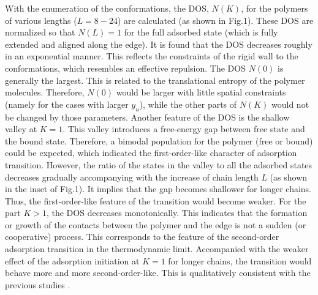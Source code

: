 \documentclass[aps,pre,twocolumn,showpacs,preprintnumbers,amsmath,amssymb]{revtex4-1}
\begin{document}
With the enumeration of the conformations, the DOS, $N(K)$, for the polymers
of various lengths ($L=8-24$)
are calculated (as shown in Fig.1). These DOS are normalized so that $N(L)=1$
for the full adsorbed state (which is fully extended and aligned along the edge).
It is found that the DOS decreases roughly in an exponential manner. This
reflects the constraints of the rigid wall to the conformations, which
resembles an effective repulsion. The DOS $N(0)$ is generally the largest.
This is related to the translational entropy of the polymer molecules.
Therefore, $N(0)$ would be larger with little spatial constraints
(namely for the cases with larger $y_u$), while the other parts of $N(K)$
would not be changed by those parameters. Another feature of the DOS
is the shallow valley at $K=1$. This valley introduces a free-energy
gap between free state and the bound state. Therefore, a bimodal
population for the polymer (free or bound) could be expected, which
indicated the first-order-like character of adsorption transition.
However, the ratio of the states in the valley to all the adsorbed states
decreases gradually accompanying with the increase of chain length $L$ (as
shown in the inset of Fig.1).
It implies that the gap becomes shallower for longer chains. Thus,
the first-order-like feature of the transition would become weaker.
For the part $K>1$, the DOS decreases monotonically. This indicates
that the formation or growth of the contacts between the polymer and
the edge is not a sudden (or cooperative) process. This corresponds to
the feature of the second-order adsorption transition in the thermodynamic
limit. Accompanied with the weaker effect of the adsorption initiation
at $K=1$ for longer chains, the transition would behave more and more
second-order-like. This is qualitatively consistent with the previous
studies \cite{PCCP10,JCP09,JCP09b}.
\end{document}
